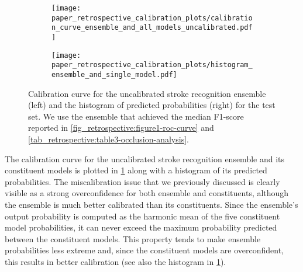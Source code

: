\begin{figure}[t!]
    \centering
    \begin{subfigure}[c]{0.49\columnwidth}
        \centering
        \texttt{[image: paper\_retrospective\_calibration\_plots/calibration\_curve\_ensemble\_and\_all\_models\_uncalibrated.pdf]}
    \end{subfigure}
    \hfill
    \begin{subfigure}[c]{0.49\columnwidth}
        \centering
        \texttt{[image: paper\_retrospective\_calibration\_plots/histogram\_ensemble\_and\_single\_model.pdf]}
    \end{subfigure}
    \caption[Calibration curve for the uncalibrated stroke recognition ensemble and empirical distribution of predicted probabilities.]{ Calibration curve for the uncalibrated stroke recognition ensemble (left) and the histogram of predicted probabilities (right) for the test set. We use the ensemble that achieved the median F1-score reported in \cref{fig_retrospective:figure1-roc-curve} and \cref{tab_retrospective:table3-occlusion-analysis}.}
    \label{fig_discussion:retrospective-paper-calibration-curve-of-uncalibrated-model}
\end{figure}

The calibration curve for the uncalibrated stroke recognition ensemble and its constituent models is plotted in \cref{fig_discussion:retrospective-paper-calibration-curve-of-uncalibrated-model} along with a histogram of its predicted probabilities. The miscalibration issue that we previously discussed is clearly visible as a strong overconfidence for both ensemble and constituents, although the ensemble is much better calibrated than its constituents. Since the ensemble's output probability is computed as the harmonic mean of the five constituent model probabilities, it can never exceed the maximum probability predicted between the constituent models. This property tends to make ensemble probabilities less extreme and, since the constituent models are overconfident, this results in better calibration (see also the histogram in \cref{fig_discussion:retrospective-paper-calibration-curve-of-uncalibrated-model}). 


